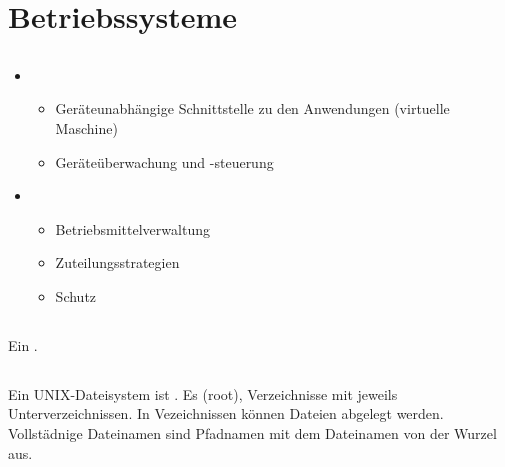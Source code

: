 \section{Betriebssysteme}

\subsection{}

\begin{answer}
    \begin{itemize}
    \item {}
        \begin{itemize}
            \item Geräteunabhängige Schnittstelle zu den Anwendungen (virtuelle Maschine)
            \item Geräteüberwachung und -steuerung
        \end{itemize}
    
    \item {}
        \begin{itemize}
            \item Betriebsmittelverwaltung
            \item Zuteilungsstrategien
            \item Schutz
        \end{itemize}
    \end{itemize}
\end{answer}

\subsection{}
\begin{answer}
Ein .
\end{answer}

\subsection{}
\begin{answer}
Ein UNIX-Dateisystem ist . Es  (root), Verzeichnisse
mit jeweils Unterverzeichnissen. In Vezeichnissen können Dateien abgelegt werden.
Vollstädnige Dateinamen sind Pfadnamen mit dem Dateinamen von der Wurzel aus.
\end{answer}


